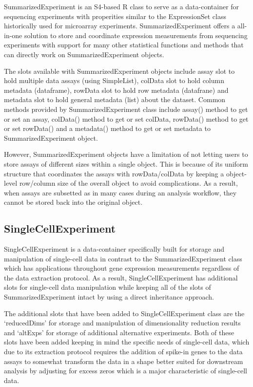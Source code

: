 \documentclass[
]{article}
\begin{document}
SummarizedExperiment is an S4-based R class to serve as a data-container
for sequencing experiments with properities similar to the ExpressionSet
class historically used for microarray experiments. SummarizedExperiment
offers a all-in-one solution to store and coordinate expression
measurements from sequencing experiments with support for many other
statistical functions and methods that can directly work on
SummarizedExperiment objects.

The slots available with SummarizedExperiment objects include assay slot
to hold multiple data assays (using SimpleList), colData slot to hold
column metadata (dataframe), rowData slot to hold row metadata
(datafrane) and metadata slot to hold general metadata (list) about the
dataset. Common methods provided by SummarizedExperiment class include
assay() method to get or set an assay, colData() method to get or set
colData, rowData() method to get or set rowData() and a metadata()
method to get or set metadata to SummarizedExperiment object.

However, SummarizedExperiment objects have a limitation of not letting
users to store assays of different sizes within a single object. This is
because of its uniform structure that coordinates the assays with
rowData/colData by keeping a object-level row/column size of the overall
object to avoid complications. As a result, when assays are subsetted as
in many cases during an analysis workflow, they cannot be stored back
into the original object.

\hypertarget{singlecellexperiment}{%
\subsection{SingleCellExperiment}\label{singlecellexperiment}}

SingleCellExperiment is a data-container specifically built for storage
and manipulation of single-cell data in contrast to the
SummarizedExperiment class which has applications throughout gene
expression measurements regardless of the data extraction protocol. As a
result, SingleCellExperiment has additional slots for single-cell data
manipulation while keeping all of the slots of SummarizedExperiment
intact by using a direct inheritance approach.

The additional slots that have been added to SingleCellExperiment class
are the `reducedDims' for storage and manipulation of dimensionality
reduction results and `altExps' for storage of additional alternative
experiments. Both of these slots have been added keeping in mind the
specific needs of single-cell data, which due to its extraction protocol
requires the addition of spike-in genes to the data assays to somewhat
transform the data in a shape better suited for downstream analysis by
adjusting for excess zeros which is a major characteristic of
single-cell data.
\end{document}
